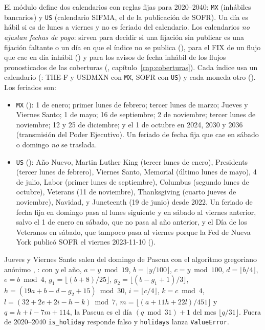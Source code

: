 \begin{sloppypar}
El módulo  define dos calendarios con reglas fijas para
2020--2040: \texttt{MX} (inhábiles bancarios) y \texttt{US} (calendario SIFMA, el de la publicación de SOFR).
Un día es hábil si es de lunes a viernes y no es feriado del calendario. Los calendarios \emph{no ajustan fechas
de pago}: sirven para decidir si una fijación sin publicar es una fijación faltante o un día en que el índice
no se publica (), para el FIX de un flujo que cae en día inhábil
() y para los avisos de fecha inhábil de los flujos pronosticados de las coberturas
(, capítulo~\ref{cap:coberturas}). Cada índice usa un calendario
(: TIIE-F y USDMXN con \texttt{MX}, SOFR con \texttt{US}) y cada
moneda otro (). Los feriados son:
\begin{itemize}
  \item \texttt{MX} (): 1 de enero; primer lunes de febrero; tercer lunes de marzo; Jueves y Viernes Santo; 1 de mayo; 16 de septiembre; 2 de noviembre; tercer lunes de noviembre; 12 y 25 de diciembre; y el 1 de octubre en 2024, 2030 y 2036 (transmisión del Poder Ejecutivo). Un feriado de fecha fija que cae en sábado o domingo \emph{no} se traslada.
  \item \texttt{US} (): Año Nuevo, Martin Luther King (tercer lunes de enero), Presidents (tercer lunes de febrero), Viernes Santo, Memorial (último lunes de mayo), 4 de julio, Labor (primer lunes de septiembre), Columbus (segundo lunes de octubre), Veterans (11 de noviembre), Thanksgiving (cuarto jueves de noviembre), Navidad, y Juneteenth (19 de junio) desde 2022. Un feriado de fecha fija en domingo pasa al lunes siguiente y en sábado al viernes anterior, salvo el 1 de enero en sábado, que no pasa al año anterior, y el Día de los Veteranos en sábado, que tampoco pasa al viernes porque la Fed de Nueva York publicó SOFR el viernes 2023-11-10 ().
\end{itemize}
Jueves y Viernes Santo salen del domingo de Pascua con el algoritmo gregoriano anónimo
\citep{meeus1998}, : con $y$ el año, $a=y \bmod 19$, $b=\lfloor y/100\rfloor$,
$c=y\bmod 100$, $d=\lfloor b/4\rfloor$, $e=b\bmod 4$, $g_1=\lfloor (b+8)/25\rfloor$,
$g_2=\lfloor (b-g_1+1)/3\rfloor$, $h=(19a+b-d-g_2+15)\bmod 30$, $i=\lfloor c/4\rfloor$, $k=c\bmod 4$,
$l=(32+2e+2i-h-k)\bmod 7$, $m=\lfloor (a+11h+22l)/451\rfloor$ y $q=h+l-7m+114$, la Pascua es el día
$(q \bmod 31)+1$ del mes $\lfloor q/31\rfloor$. Fuera de 2020--2040 \texttt{is\_holiday} responde falso y
\texttt{holidays} lanza \texttt{ValueError}.


\end{sloppypar}
